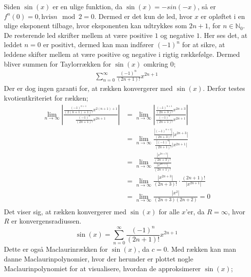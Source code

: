 Siden $\sin(x)$ er en ulige funktion, da $\sin(x)=-sin(-x)$, så er $f^{n}(0)=0, \text{hvis} n \mod 2=0$. Dermed er det kun de led, hvor $x$ er opløftet i en ulige eksponent tilbage, hvor eksponenten kan udtrykkes som $2n+1$, for $n\in \mathbb{N}_0$. De resterende led skrifter mellem at være positive $1$ og negative $1$. Her ses det, at leddet $n=0$ er positivt, dermed kan man indfører $(-1)^n$ for at sikre, at leddene skifter mellem at være positive og negative i rigtig rækkefølge. Dermed bliver summen for Taylorrækken for $\sin(x)$ omkring $0$;
\begin{align*}
\sum_{n=0}^{\infty} \frac{(-1)^n}{(2n+1)!}x^{2n+1}
\end{align*}
Der er dog ingen garanti for, at rækken konvergerer med $\sin(x)$. Derfor testes kvotientkriteriet for rækken;
\begin{align*}
\lim\limits_{n \to \infty}
\left\lvert
\frac{\frac{(-1)^{n+1}}{(2(n+1)+1)!}x^{2(n+1)+1}}
{\frac{(-1)^n}{(2n+1)!}x^{2n+1}} 
\right\lvert
&=
\lim\limits_{n \to \infty}
\left\lvert
\frac{\frac{(-1)^{n+1}}{(2n+3)!}x^{2n+3}}
{\frac{(-1)^n}{(2n+1)!}x^{2n+1}}
\right\lvert 
\\
&=
\lim\limits_{n \to \infty}
\frac{\frac{\left\lvert (-1)^{n+1} \right\lvert }{(2n+3)!} \left\lvert x^{2n+3} \right\lvert }
{\frac{\left\lvert (-1)^n \right\lvert }{(2n+1)!} \left\lvert x^{2n+1} \right\lvert }
\\
&=
\lim\limits_{n \to \infty}
\frac{\frac{\left\lvert x^{2n+3} \right\lvert}{(2n+3)!}}
{\frac{\left\lvert x^{2n+1} \right\lvert}{(2n+1)!} }
\\
&=
\lim\limits_{n \to \infty}
\frac{\left\lvert x^{2n+3} \right\lvert}{(2n+3)!}
\cdot
\frac{(2n+1)!}{\left\lvert x^{2n+1} \right\lvert}
\\
&=
\lim\limits_{n \to \infty}
\frac{\left\lvert x^{2} \right\lvert}{(2n+3)(2n+2)}
=0 \\
\end{align*}
Det viser sig, at rækken konvergerer med $\sin(x)$ for alle $x$'er, da $R=\infty$, hvor $R$ er konvergensradiussen.
\begin{equation}\label{eq:sinrække}
\sin(x)=\sum_{n=0}^{\infty} \frac{(-1)^n}{(2n+1)!}x^{2n+1}
\end{equation}
Dette er også Maclaurinrækken for $\sin(x)$, da $c=0$. Med rækken kan man danne Maclaurinpolynomier, hvor der herunder er plottet nogle Maclaurinpolynomiet for at visualisere, hvordan de approksimerer $\sin(x)$;
